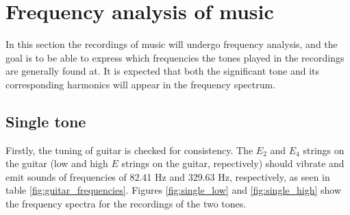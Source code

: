 \section{Frequency analysis of music}
In this section the recordings of music will undergo frequency analysis, and the goal is to be able to express which frequencies the tones played in the recordings are generally found at. It is expected that both the significant tone and its corresponding harmonics will appear in the frequency spectrum.
   
\subsection{Single tone} \label{sec:single}
Firstly, the tuning of guitar is checked for consistency. The $E_2$ and $E_4$ strings on the guitar (low and high $E$ strings on the guitar, repectively) should vibrate and emit sounds of frequencies of 82.41 Hz and 329.63 Hz, respectively, as seen in table \ref{fig:guitar_frequencies}. Figures \ref{fig:single_low} and \ref{fig:single_high} show the frequency spectra for the recordings of the two tones.
